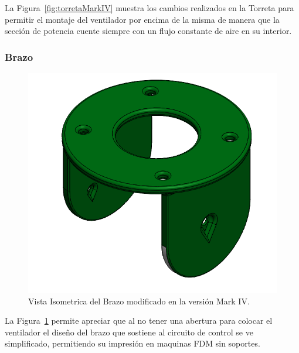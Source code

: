     La Figura~\ref{fig:torretaMarkIV} muestra los cambios realizados en la Torreta para permitir el montaje del ventilador por encima de la misma de manera que la sección de potencia cuente siempre con un flujo constante de aire en su interior.
    
    \subsubsection{Brazo}

    \begin{figure}[H]
    \centering
    \begin{adjustbox}{width=0.7\linewidth}
      \includegraphics{media/markiv/brazo.png}
    \end{adjustbox}
    \caption{\label{fig:brazoMarkIV} Vista Isometrica del Brazo modificado en la versión Mark IV.}
    \end{figure}

     La Figura~\ref{fig:brazoMarkIV} permite apreciar que al no tener una abertura para colocar el ventilador el diseño del brazo que sostiene al circuito de control se ve simplificado, permitiendo su impresión en maquinas FDM sin soportes.
